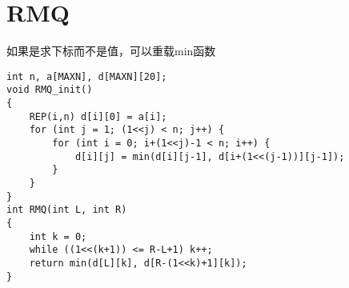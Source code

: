 \section{RMQ}

如果是求下标而不是值，可以重载min函数

\begin{lstlisting}
int n, a[MAXN], d[MAXN][20];
void RMQ_init()
{
    REP(i,n) d[i][0] = a[i];
    for (int j = 1; (1<<j) < n; j++) {
        for (int i = 0; i+(1<<j)-1 < n; i++) {
            d[i][j] = min(d[i][j-1], d[i+(1<<(j-1))][j-1]);
        }
    }
}
int RMQ(int L, int R)
{
    int k = 0;
    while ((1<<(k+1)) <= R-L+1) k++;
    return min(d[L][k], d[R-(1<<k)+1][k]);
}
\end{lstlisting}